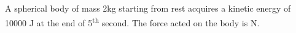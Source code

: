 \item A spherical body of mass 2kg starting from rest acquires a kinetic energy of 10000 J at the end of 5\textsuperscript{th} second. The force acted on the body is \underline{\hspace{2.5cm}} N.